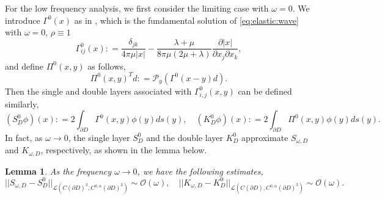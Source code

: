 \documentclass[a4paper,11pt]{article}
\newtheorem{lemma}{Lemma}[section]
\theoremstyle{remark}
\theoremstyle{definition}
\numberwithin{equation}{section}
\begin{document}
For the low frequency analysis, we first consider the limiting case with $\omega=0$.
We introduce $\Gamma^0(x)$ as in \cite{PH}, which is the fundamental solution of \eqref{eq:elastic:wave} with $\omega=0$, $\rho \equiv 1$
\begin{equation}\label{eq:gamma0}
\Gamma_{ij}^0(x): = \frac{\delta_{jk}}{4 \pi \mu |x|} - \frac{\lambda + \mu}{8\pi \mu(2\mu + \lambda)} \frac{\partial |x|}{\partial x_j \partial x_k},
\end{equation}
and define $\Pi^0(x,y)$ as follows,
\[
\Pi^0(x,y)^{T}d: = \mathcal{P}_y(\Gamma^0(x-y)d).
\]
Then the single and double layers associated with $\Gamma_{i,j}^0(x,y)$ can be defined similarly,
\begin{equation}\label{eq:gamma0:layer}
(S^{0}_{D}\phi)(x): = 2\int_{\partial D} \Gamma^{0}(x,y)\phi(y)ds(y), \quad (K^{0}_{D}\phi)(x): = 2\int_{\partial D} \Pi^{0}(x,y)\phi(y)ds(y).
\end{equation}
In fact, as $\omega \rightarrow 0$, the single layer $S^{0}_{D}$ and the double layer $K^{0}_{D}$ approximate $S_{\omega,D}$ and $K_{\omega,D}$, respectively, as shown in the lemma below.
\begin{lemma}\label{lem:layer:diff}
As the frequency $\omega \rightarrow 0$, we have the following estimates,
\begin{equation}\label{eq:estimates:layers}
||S_{\omega, D} - S_{D}^{0}||_{\mathcal{L}(C(\partial D)^3, C^{0, \alpha}(\partial D)^3)}  \sim \mathcal{O}(\omega), \quad ||K_{\omega, D} - K_{D}^{0}||_{\mathcal{L}(C(\partial D), C^{0, \alpha}(\partial D)^3)}  \sim \mathcal{O}(\omega).
\end{equation}
\end{lemma}
\end{document}
